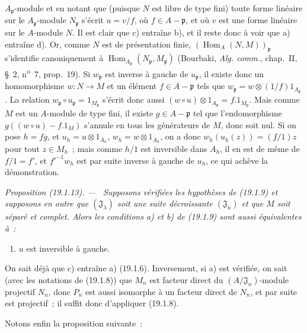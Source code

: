 \documentclass[10pt,oneside]{book}
\makeatletter
\newcommand{\setmanualcurrentlabel}[1]{\def\@currentlabel{#1}}
\newenvironment{proposition}[1][]{%
  \setmanualcurrentlabel{#1}\par\medskip\noindent\itshape Proposition (#1). ---\ }{\par}
\makeatother
\begin{document}
$A_{\mathfrak p}$-module et en notant que (puisque $N$ est libre de type fini)
toute forme linéaire sur le $A_{\mathfrak p}$-module $N_{\mathfrak p}$ s'écrit
$u=v/f$, où $f\in A-\mathfrak p$, et où $v$ est une forme linéaire sur le
$A$-module $N$. Il est clair que c) entraîne b), et il reste donc à voir que a)
entraîne d). Or, comme $N$ est de présentation finie,
$(\operatorname{Hom}_A(N,M))_{\mathfrak p}$ s'identifie canoniquement à
$\operatorname{Hom}_{A_{\mathfrak p}}(N_{\mathfrak p},M_{\mathfrak p})$
(Bourbaki, \emph{Alg. comm.}, chap.~II, §~2, n\textsuperscript{o}~7,
prop.~19). Si $w_{\mathfrak p}$ est inverse à gauche de $u_{\mathfrak p}$, il
existe donc un homomorphisme $w:N\to M$ et un élément $f\in A-\mathfrak p$
tels que $w_{\mathfrak p}=w\otimes(1/f)1_{A_{\mathfrak p}}$. La relation
$w_{\mathfrak p}\circ u_{\mathfrak p}=1_{M_{\mathfrak p}}$ s'écrit donc aussi
$(w\circ u)\otimes1_{A_{\mathfrak p}}=f.1_{M_{\mathfrak p}}$. Mais comme $M$
est un $A$-module de type fini, il existe $g\in A-\mathfrak p$ tel que
l'endomorphisme $g((w\circ u)-f.1_M)$ s'annule en tous les générateurs de $M$,
donc soit nul. Si on pose $h=fg$, et
$u_h=u\otimes1_{A_h}$, $w_h=w\otimes1_{A_h}$, on a donc
$w_h(u_h(z))=(f/1)z$ pour tout $z\in M_h$~; mais comme $h/1$ est inversible
dans $A_h$, il en est de même de $f/1=f'$, et $f'^{-1}w_h$ est par suite
inverse à gauche de $u_h$, ce qui achève la démonstration.

\begin{proposition}[19.1.13]
\label{0.19.1.13-fr}
Supposons vérifiées les hypothèses de (19.1.9) et supposons en outre que
$(\mathfrak J_\lambda)$ soit une suite décroissante $(\mathfrak J_n)$ et que
$M$ soit séparé et complet. Alors les conditions a) et b) de (19.1.9) sont
aussi équivalentes à~:
\begin{enumerate}
  \item[c)] $u$ est inversible à gauche.
\end{enumerate}
\end{proposition}

On sait déjà que c) entraîne a) (19.1.6). Inversement, si a) est vérifiée, on
sait (avec les notations de (19.1.8)) que $M_n$ est facteur direct du
$(A/\mathfrak J_n)$-module projectif $N_n$, donc $P_n$ est aussi isomorphe à
un facteur direct de $N_n$, et par suite est projectif~; il suffit donc
d'appliquer (19.1.8).

Notons enfin la proposition suivante~:
\end{document}
